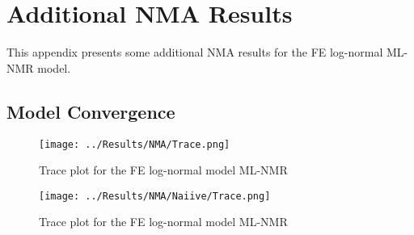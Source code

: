 \chapter{Additional NMA Results}\label{NMAAppendix}

This appendix presents some additional NMA results for the FE log-normal ML-NMR model. 

\section{Model Convergence}

\begin{figure}
    \centering
    \texttt{[image: ../Results/NMA/Trace.png]}
    \caption{Trace plot for the FE log-normal model ML-NMR}
    \label{fig:tracebc}
\end{figure}

\begin{figure}
    \centering
    \texttt{[image: ../Results/NMA/Naiive/Trace.png]}
    \caption{Trace plot for the FE log-normal model ML-NMR}
    \label{fig:trace}
\end{figure}

